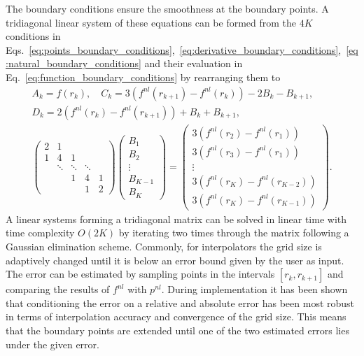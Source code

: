 The boundary conditions ensure the smoothness at the boundary points.
A tridiagonal linear system of these equations can be formed from the $4K$ conditions in Eqs.~\ref{eq:points_boundary_conditions},~\ref{eq:derivative_boundary_conditions},~\ref{eq:natural_boundary_conditions} and their evaluation in Eq.~\ref{eq:function_boundary_conditions} by rearranging them to\cite{bartels1995introduction}
\begin{subequations}
\begin{align}
A_k = f(r_k),\quad C_k = 3(f^{nl}(r_{k+1})-f^{nl}(r_k)) - 2B_k-B_{k+1},\\
D_k = 2(f^{nl}(r_{k})-f^{nl}(r_{k+1})) + B_k+B_{k+1},\hspace{5em}\\
\begin{pmatrix}
    2 & 1       &           &       &    \\
    1 & 4       & 1         &           &    \\
      & \ddots  & \ddots    & \ddots    &           \\
      &         & 1         &     4     & 1   \\
      &         &           &     1     & 2
\end{pmatrix}
\begin{pmatrix}
B_1\\
B_2\\
\vdots\\
B_{K-1}\\
B_{K}
\end{pmatrix}
=
\begin{pmatrix}
3(f^{nl}(r_2)-f^{nl}(r_1))\\
3(f^{nl}(r_3)-f^{nl}(r_1))\\
\vdots\\
3(f^{nl}(r_K)-f^{nl}(r_{K-2}))\\
3(f^{nl}(r_K)-f^{nl}(r_{K-1}))
\end{pmatrix}.
\end{align}
\end{subequations}
A linear systems forming a tridiagonal matrix can be solved in linear time with time complexity $O(2K)$ by iterating two times through the matrix following a Gaussian elimination scheme.
%    
Commonly, for interpolators the grid size is adaptively changed until it is below an error bound given by the user as input.
The error can be estimated by sampling points in the intervals $[r_k,r_{k+1}]$ and comparing the results of $f^{nl}$ with $p^{nl}$.
During implementation it has been shown that conditioning the error on a relative and absolute error has been most robust in terms of interpolation accuracy and convergence of the grid size.
This means that the boundary points are extended until one of the two estimated errors lies under the given error.

